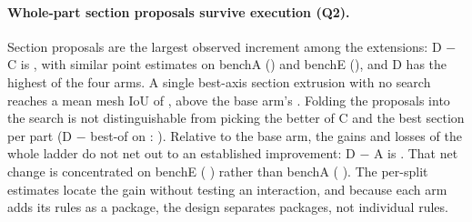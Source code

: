 \paragraph{Whole-part section proposals survive execution (Q2).}
Section proposals are the largest observed \iouc{} increment among the extensions: D $-$ C is \dSecBeamCadDiff{} \dSecBeamCadCI, with similar point estimates on benchA (\dSecBeamSplitACadDiff) and benchE (\dSecBeamSplitECadDiff), and D has the highest \iouc{} of the four arms. A single best-axis section extrusion with no search reaches a mean mesh IoU of \sectionsOnlyIou, above the base arm's \armBaseIou. Folding the proposals into the search is not distinguishable from picking the better of C and the best section per part (D $-$ best-of on \iouc: \dSecBestOfCadDiff{} \dSecBestOfCadCI). Relative to the base arm, the gains and losses of the whole ladder do not net out to an established \iouc{} improvement: D $-$ A is \dSecBaseCadDiff{} \dSecBaseCadCI. That net change is concentrated on benchE (\dSecBaseSplitECadDiff{} \dSecBaseSplitECadCI) rather than benchA (\dSecBaseSplitACadDiff{} \dSecBaseSplitACadCI). The per-split estimates locate the gain without testing an interaction, and because each arm adds its rules as a package, the design separates packages, not individual rules.
